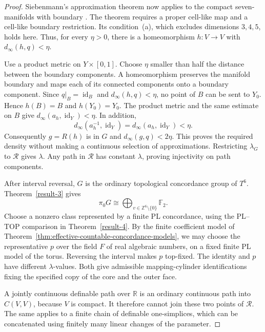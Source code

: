 \begin{proof}
Siebenmann's approximation theorem now applies to the compact
seven-manifolds with boundary
\cite[Theorem~A, p.~271]{Siebenmann1972Approximation}.
The theorem requires a proper cell-like map and a cell-like
boundary restriction.  Its condition~(a), which excludes
dimensions $3,4,5$, holds here.  Thus, for every $\eta>0$, there
is a homeomorphism $h:V\to V$ with
$d_\infty(h,q)<\eta$.

Use a product metric on $Y\times[0,1]$.  Choose $\eta$ smaller
than half the distance between the boundary components.
A homeomorphism preserves the manifold boundary and maps each
of its connected components onto a boundary component.  Since
$q|_B=\operatorname{id}_B$ and $d_\infty(h,q)<\eta$, no point
of $B$ can be sent to $Y_0$.  Hence $h(B)=B$ and $h(Y_0)=Y_0$.
The product metric and the same estimate on $B$ give
$d_\infty(a_h,\operatorname{id}_Y)<\eta$.  In addition,
\[
 d_\infty(a_h^{-1},\operatorname{id}_Y)
   =d_\infty(a_h,\operatorname{id}_Y)<\eta.
\]
Consequently $g=R(h)$ is in $G$ and
$d_\infty(g,q)<2\eta$.  This proves the required density
without making a continuous selection of approximations.
Restricting $\lambda_G$ to $\mathcal R$ gives $\lambda$.
Any path in $\mathcal R$ has constant $\lambda$, proving
injectivity on path components.

After interval reversal, $G$ is the ordinary topological
concordance group of $T^6$.  Theorem~\ref{result-3} gives
\[
 \pi_0G\cong
 \bigoplus_{v\in\mathbb Z^6\setminus\{0\}}\mathbb F_2.
\]
Choose a nonzero class represented by a finite PL concordance,
using the PL--TOP comparison in Theorem~\ref{result-4}.
By the finite coefficient model of
Theorem~\ref{thm:effective-countable-concordance-models}, we
may choose the representative $p$ over the field $F$ of real
algebraic numbers, on a fixed finite PL model of the torus.
Reversing the interval makes $p$ top-fixed.  The identity and
$p$ have different $\lambda$-values.  Both give admissible
mapping-cylinder identifications fixing the specified copy
of the core and the outer face.

A jointly continuous definable path over $\mathbb R$ is an
ordinary continuous path into $C(V,V)$, because $V$ is compact.
It therefore cannot join these two points of $\mathcal R$.
The same applies to a finite chain of definable one-simplices,
which can be concatenated using finitely many linear changes
of the parameter.


\end{proof}

